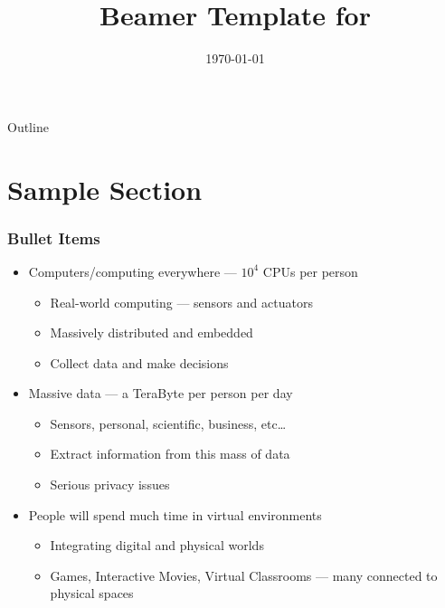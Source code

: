 \documentclass[onlycurpagenum,infolines,xcolor=table]{beamer}
\title{Beamer Template for \tamu}
\author{\theauthor}
\institute[TAMU] %
{
\tamu
}
\date %
{\today}
\begin{document}
\begin{frame}
\titlepage
\end{frame}

\begin{frame}{Outline}
\tableofcontents
\end{frame}




\section{Sample Section}

\begin{frame}
  \frametitle{Bullet Items}
  \begin{itemize}
    \item Computers/computing everywhere --- $10^4$ CPUs per person
      \begin{itemize}
        \item Real-world computing --- sensors and actuators
        \item Massively distributed and embedded
        \item Collect data and make decisions
      \end{itemize}
    \item Massive data --- a TeraByte per person per day
      \begin{itemize}
        \item Sensors, personal, scientific, business, etc\ldots
        \item Extract information from this mass of data
        \item Serious privacy issues
      \end{itemize}
    \item People will spend much time in virtual environments
      \begin{itemize}
        \item Integrating digital and physical worlds
        \item Games, Interactive Movies, Virtual Classrooms --- many connected
        to physical spaces
      \end{itemize}
  \end{itemize}
\end{frame}
\end{document}
